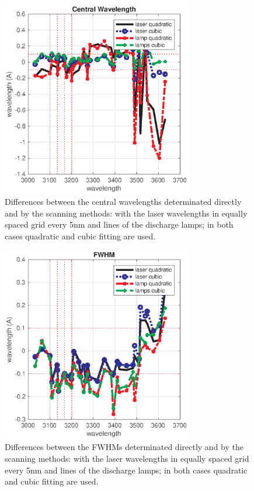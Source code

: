 \documentclass[acp, manuscript]{copernicus}
\begin{document}
\clearpage
\begin{figure}[t]
\includegraphics[width=8.3cm]{figures/General_central_comparison.eps}
\caption{Differences between the central wavelengths determinated directly and by the scanning methods: with the laser wavelengths in equally spaced grid every 5nm and lines of the discharge lamps; in both cases quadratic and cubic fitting are used.}
\label{fig:cw_comp}
\end{figure}


 \clearpage
\begin{figure}[t]
\includegraphics[width=8.3cm]{figures/General_fwhm_comparison.eps}
\caption{Differences between the FWHMs determinated directly and by the scanning methods: with the laser wavelengths in equally spaced grid every 5nm and lines of the discharge lamps; in both cases quadratic and cubic fitting are used.}
\label{fig:fwhm_comp}
\end{figure}
\end{document}
